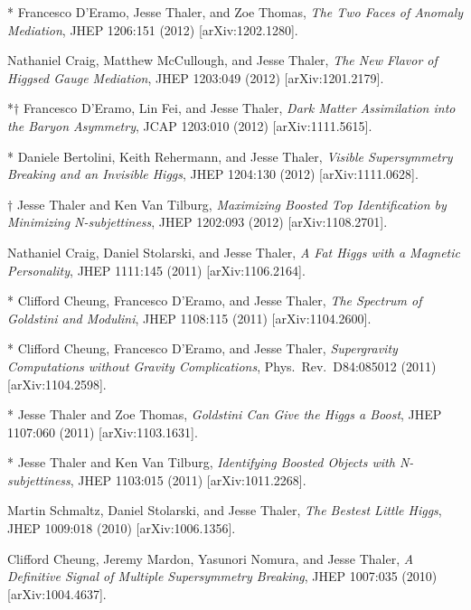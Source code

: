 \begin{list}{[]\addtocounter{jessecount}{-1}}{\leftmargin=3em \itemsep=4pt}
\item
* Francesco D'Eramo, Jesse Thaler, and Zoe Thomas,
\emph{The Two Faces of Anomaly Mediation},
JHEP 1206:151 (2012)
[arXiv:1202.1280].

\item
 Nathaniel Craig, Matthew McCullough, and Jesse Thaler,
\emph{The New Flavor of Higgsed Gauge Mediation},
JHEP 1203:049 (2012)
[arXiv:1201.2179].

\item
*$\dagger$ Francesco D'Eramo, Lin Fei, and Jesse Thaler,
\emph{Dark Matter Assimilation into the Baryon Asymmetry},
JCAP 1203:010 (2012)
[arXiv:1111.5615].

\item
* Daniele Bertolini, Keith Rehermann, and Jesse Thaler,
\emph{Visible Supersymmetry Breaking and an Invisible Higgs},
JHEP 1204:130 (2012)
[arXiv:1111.0628].

\item
$\dagger$ Jesse Thaler and Ken Van Tilburg,
\emph{Maximizing Boosted Top Identification by Minimizing N-subjettiness},
JHEP 1202:093 (2012)
[arXiv:1108.2701].

\item
 Nathaniel Craig, Daniel Stolarski, and Jesse Thaler,
\emph{A Fat Higgs with a Magnetic Personality},
JHEP 1111:145 (2011)
[arXiv:1106.2164].

\item
* Clifford Cheung, Francesco D'Eramo, and Jesse Thaler,
\emph{The Spectrum of Goldstini and Modulini},
JHEP 1108:115 (2011)
[arXiv:1104.2600].

\item
* Clifford Cheung, Francesco D'Eramo, and Jesse Thaler,
\emph{Supergravity Computations without Gravity Complications},
Phys.\ Rev.\ D84:085012 (2011)
[arXiv:1104.2598].

\item
* Jesse Thaler and Zoe Thomas,
\emph{Goldstini Can Give the Higgs a Boost},
JHEP 1107:060 (2011)
[arXiv:1103.1631].

\item
* Jesse Thaler and Ken Van Tilburg,
\emph{Identifying Boosted Objects with N-subjettiness},
JHEP 1103:015 (2011)
[arXiv:1011.2268].

\item
 Martin Schmaltz, Daniel Stolarski, and Jesse Thaler,
\emph{The Bestest Little Higgs},
JHEP 1009:018 (2010)
[arXiv:1006.1356].

\item
 Clifford Cheung, Jeremy Mardon, Yasunori Nomura, and Jesse Thaler,
\emph{A Definitive Signal of Multiple Supersymmetry Breaking},
JHEP 1007:035 (2010)
[arXiv:1004.4637].


\end{list}
